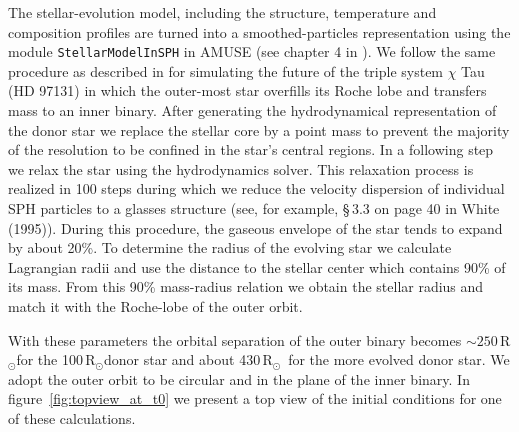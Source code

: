 \documentclass[twocolumn]{aastex62}
\newcommand{\RSun}{\mbox{R$_\odot$}}
\begin{document}
The stellar-evolution model, including the structure, temperature and
composition profiles are turned into a smoothed-particles
representation using the module {\tt StellarModelInSPH} in AMUSE (see
chapter 4 in \cite{AMUSE}).  We follow the same procedure as described
in \cite{2014MNRAS.438.1909D} for simulating the future of the triple
system $\chi$ Tau (HD 97131) in which the outer-most star overfills
its Roche lobe and transfers mass to an inner binary.  After
generating the hydrodynamical representation of the donor star we
replace the stellar core by a point mass to prevent the majority of
the resolution to be confined in the star's central regions.  In a
following step we relax the star using the hydrodynamics solver. This
relaxation process is realized in 100 steps during which we reduce the
velocity dispersion of individual SPH particles to a glasses structure 
(see, for example, \S\,3.3 on page 40 in White (1995)).  During this procedure, the gaseous
envelope of the star tends to expand by about 20\%.  To determine the
radius of the evolving star we calculate Lagrangian radii and use the
distance to the stellar center which contains 90\% of its mass. From
this 90\% mass-radius relation we obtain the stellar radius and match
it with the Roche-lobe of the outer orbit.

With these parameters the orbital separation of the outer binary
becomes $\sim 250$\,\RSun for the 100\,\RSun donor star and about
430\,\RSun\, for the more evolved donor star.  We adopt the outer
orbit to be circular and in the plane of the inner binary.
In figure~\ref{fig:topview_at_t0} we present a top view of the initial
conditions for one of these calculations.
\end{document}
